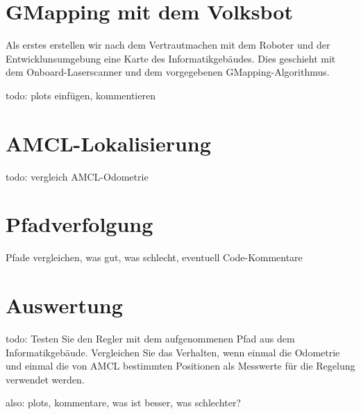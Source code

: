\documentclass[11pt,a4paper]{article}
\begin{document}
\newpage

\section{GMapping mit dem Volksbot}
Als erstes erstellen wir nach dem Vertrautmachen mit dem Roboter und der Entwicklunsumgebung eine Karte des Informatikgebäudes. 
Dies geschieht mit dem Onboard-Laserscanner und dem vorgegebenen GMapping-Algorithmus.

todo: plots einfügen, kommentieren

\section{AMCL-Lokalisierung}
todo: vergleich AMCL-Odometrie

\section{Pfadverfolgung}
Pfade vergleichen, was gut, was schlecht, eventuell Code-Kommentare 

\section{Auswertung}
todo: 
Testen Sie den Regler mit dem aufgenommenen Pfad aus dem Informatikgebäude. Vergleichen Sie das Verhalten, wenn einmal die Odometrie und einmal die von AMCL bestimmten
Positionen als Messwerte für die Regelung verwendet werden.

also: plots, kommentare, was ist besser, was schlechter?
\end{document}
